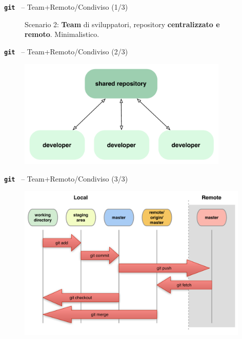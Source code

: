 \documentclass{beamer}
\newcommand{\git}{\texttt{\textbf{git}}\xspace}
\begin{document}
\begin{frame}{\centerline{\git ~ -- Team+Remoto/Condiviso (1/3)}}
  \begin{figure}
    \centering
    Scenario 2: \textbf{Team} di sviluppatori, repository \textbf{centralizzato e remoto}. Minimalistico.
  \end{figure}
\end{frame}

\begin{frame}{\centerline{\git ~ -- Team+Remoto/Condiviso (2/3)}}
  \begin{figure}
    \centering
    \includegraphics[width=10cm]{A2023.LavoroCondiviso/workflow-a}
  \end{figure}
\end{frame}

\begin{frame}{\centerline{\git ~ -- Team+Remoto/Condiviso (3/3)}}
  \begin{figure}
    \centering
    \includegraphics[width=11cm]{A2023.LavoroCondiviso/local-remote}
  \end{figure}  
\end{frame}
\end{document}
